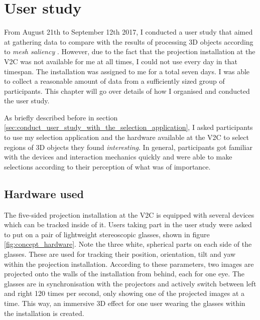 \chapter{User study}
\label{sec:user_study_chapter}
%
%

From August 21th to September 12th 2017, I conducted a user study that aimed at gathering data to compare with the results of processing 3D objects according to \textit{mesh saliency} \cite{lee2005mesh}. However, due to the fact that the projection installation at the V2C was not available for me at all times, I could not use every day in that timespan. The installation was assigned to me for a total seven days. I was able to collect a reasonable amount of data from a sufficiently sized group of participants. This chapter will go over details of how I organised and conducted the user study.

As briefly described before in section \ref{sec:conduct_user_study_with_the_selection_application}, I asked participants to use my selection application and the hardware available at the V2C to select regions of 3D objects they found \textit{interesting}. In general, participants got familiar with the devices and interaction mechanics quickly and were able to make selections according to their perception of what was of importance.

	\section{Hardware used}
	\label{sec:hardware_used}
%
%

The five-sided projection installation at the V2C is equipped with several devices which can be tracked inside of it. Users taking part in the user study were asked to put on a pair of lightweight stereoscopic glasses, shown in figure \ref{fig:concept_hardware}. Note the three white, spherical parts on each side of the glasses. These are used for tracking their position, orientation, tilt and yaw within the projection installation. According to these parameters, two images are projected onto the walls of the installation from behind, each for one eye. The glasses are in synchronisation with the projectors and actively switch between left and right 120 times per second, only showing one of the projected images at a time. This way, an immersive 3D effect for one user wearing the glasses within the installation is created.  

